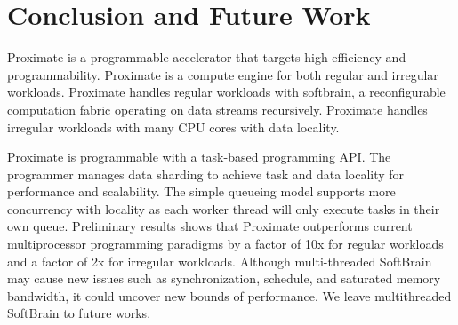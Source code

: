 \section{Conclusion and Future Work} \label{sec:conc}
Proximate is a programmable accelerator that targets high 
efficiency and programmability. Proximate is a compute engine 
for both regular and irregular workloads.
Proximate handles regular workloads with softbrain, 
a reconfigurable computation fabric operating on 
data streams recursively. Proximate handles irregular workloads with many CPU cores with data locality. 

Proximate is programmable with a task-based programming API. 
The programmer manages data sharding to achieve task and data locality for performance and scalability. 
The simple queueing model supports more concurrency with locality 
as each worker thread will only execute tasks in their own queue. 
Preliminary results shows that Proximate outperforms current 
multiprocessor programming paradigms by a factor of 10x for regular 
workloads and a factor of 2x for irregular workloads. Although
multi-threaded SoftBrain may cause new issues such as synchronization, 
schedule, and saturated memory bandwidth, it could uncover new bounds of performance. We leave multithreaded SoftBrain to future works. 



